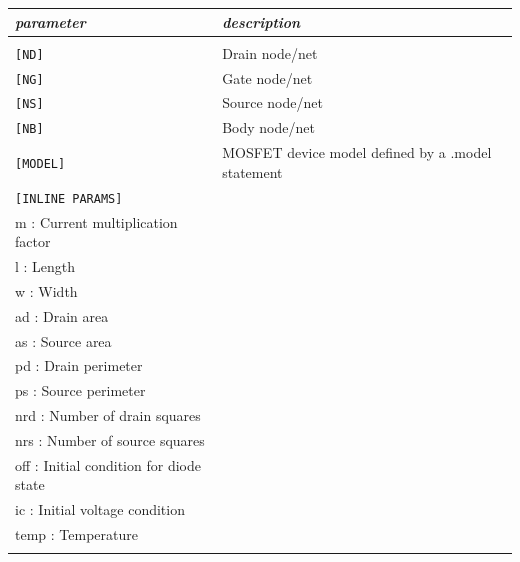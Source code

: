 \begin{longtable}{l l}
\textit{parameter} & \textit{description} \\ \hline \\ \vspace{-0.8\parskip}
\texttt{[ND]} & Drain node/net \\
\texttt{[NG]} & Gate node/net \\
\texttt{[NS]} & Source node/net \\
\texttt{[NB]} & Body node/net \\
\texttt{[MODEL]} & MOSFET device model defined by a .model statement \\
\texttt{[INLINE PARAMS]} & \begin{tabular}{lp{5.5cm}p{5cm}}\textit{Inline parameters :} \\ 
																					{\small m : Current multiplication factor} \\ 
																					{\small l : Length}\\
																					{\small w : Width} \\
																					{\small ad : Drain area} \\
																					{\small as : Source area} \\
																					{\small pd : Drain perimeter} \\
																					{\small ps : Source perimeter} \\
																					{\small nrd : Number of drain squares} \\
																					{\small nrs : Number of source squares} \\																					{\small off : Initial condition for diode state} \\
																					{\small ic :  Initial voltage condition} \\
																					{\small temp : Temperature} \\
																					\end{tabular} 
\end{longtable}

